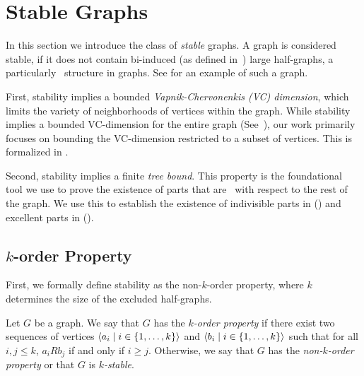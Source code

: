 \section{Stable Graphs} \label{sec:section_3}

    In this section we introduce the class of \emph{stable} graphs.
    A graph is considered stable, if it does not contain bi-induced (as defined in~\cite{induced_subgraph_density_vi_bounded_vc_dimension})
    large half-graphs, a particularly \irregular{}~structure in graphs.
    See  for an example of such a graph.

    

    First, stability implies a bounded \emph{Vapnik-Chervonenkis (VC) dimension}, which limits the variety of
    neighborhoods of vertices within the graph.
    While stability implies a bounded VC-dimension for the entire graph
    (See~\cite{regularity_partitions_and_the_topology_of_graphons}), our work primarily focuses on bounding
    the VC-dimension restricted to a subset of vertices.
    This is formalized in .

    Second, stability implies a finite \emph{tree bound}.
    This property is the foundational tool we use to prove the existence of parts that are \regular~with
    respect to the rest of the graph.
    We use this to establish the existence of indivisible parts in 
    () and
    excellent parts in  ().

    \subsection{$k$-order Property} \label{subsec:subsection_3.1}

        First, we formally define stability as the non-$k$-order property, where $k$ determines the size of the
        excluded half-graphs.

        \begin{definition} \label{def:k_order_property}
            Let $G$ be a graph.
            We say that $G$ has the \emph{$k$-order property} if there exist two sequences of vertices
            $\left< a_i \mid i \in \{ 1, \dots, k \} \right>$ and $\left< b_i \mid i \in \{ 1, \dots, k \} \right>$ such that
            for all $i,j \leq k$, $a_i R b_j$ if and only if $i \geq j$.
            Otherwise, we say that $G$ has the \emph{non-$k$-order property} or that $G$ is \emph{$k$-stable}.
        \end{definition}

